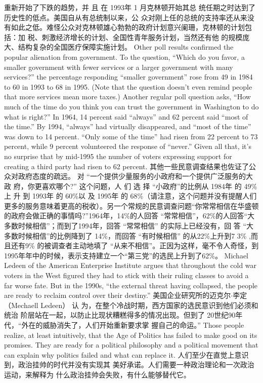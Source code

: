 \begin{paracol}{2}
重新开始了下跌的趋势，并 且 在 1993年 1 月克林顿开始其总
统任期之时达到了历史性的低点。美国自从有总统制以来，公
众对刚上任的总统的支持率还从来没有如此之低。难怪公众对克林顿雄心勃勃的政府计划意兴阑珊，克林顿的计划包括：加
税、刺激经济增长的计划、全国性青年服务计划，当然还有他
的规模庞大、结构复杂的全国医疗保障实施计划。
\switchcolumn*
Other poll results confirmed the popular alienation from
government. To the question, ``Which do you favor, a smaller
government with fewer services or a larger government with
many services?'' the percentage responding ``smaller government'' rose from 49 in 1984 to 60 in 1993 to 68 in 1995. (Note
that the question doesn't even remind people that more services
mean more taxes.) Another regular poll question asks, ``How
much of the time do you think you can trust the government in
Washington to do what is right?'' In 1964, 14 percent said ``always'' and 62 percent said ``most of the time.'' By 1994, ``always'' had virtually disappeared, and ``most of the time'' was
down to 14 percent. ``Only some of the time'' had risen from 22
percent to 73 percent, while 9 percent volunteered the response
of ``never.'' Given all that, it's no surprise that by mid-1995 the
number of voters expressing support for creating a third party
had risen to 62 percent.
\switchcolumn
其他一些民意调查结果也佐证了公众对政府态度的疏远。
对 “一个提供少量服务的小政府和一个提供广泛服务的大政
府，你更喜欢哪个?” 这个问题，人 们 选 择 “小政府”的比例从 1984年 的 49\%上 升 到 1993年 的 60\%以 及 1995年 的 68\%（请注意，这个问题并没有提醒人们更多的服务意味着更高的税收）。另一个常规的民意调查问题“你常常相信在华盛顿的政府会做正确的事情吗?”1964年，14\%的人回答 “常常相信”，62\%的人回答“大多数时候相信”；而到了1994年，回答 “常常相信” 的实际上已经没有，回 答 “大多数时候相信”的比例降到了 14\%，而回答 “有时候相信” 的从22\%上升到7 3\% ,而且还有9\% 的被调查者主动地填了 “从来不相信”。正因为这样，毫不令人奇怪，到 1995年年中的时候，表示支持建立一个“第三党”的选民上升到了62\%。
\switchcolumn*
Michael Ledeen of the American Enterprise Institute
argues that throughout the cold war voters in the West figured they had to stick with their ruling classes to avoid a far
worse fate. But in the 1990s, ``the external threat having
collapsed, the people are ready to reclaim control over their
destiny.''
\switchcolumn
美国企业研究所的迈克尔$\cdot$李定 （Mechaell Ledeen） 认
为，在整个冷战时期，西方国家的选民意识到他们必须和统治
阶层站在一起，以防止比现状糟糕得多的情况出现。但到了
20世纪90年代，“外在的威胁消失了，人们开始重新要求掌
握自己的命运。”
\switchcolumn*
Those people realize, at least intuitively, that the Age of Politics has failed to make good on its promises. They are ready for
a political philosophy and a political movement that can explain
why politics failed and what can replace it.
\switchcolumn
人们至少在直觉上意识到，政治挂帅的时代并没有实现其
美好承诺。人们需要一种政治理论和一次政治运动，来解释为
什么政治挂帅会失败，有什么能够替代它。


\end{paracol}
